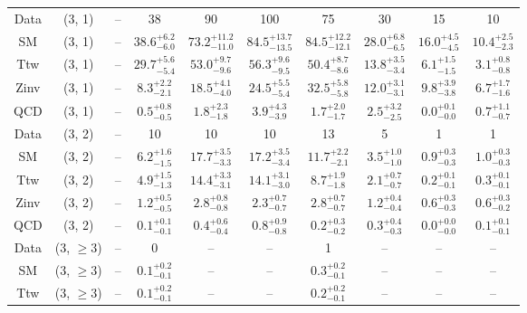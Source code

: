 \begin{table}[h!]
{\begin{tabular}{cccccccccc}
	Data & (3, 1) & -- & 38 & 90 & 100 & 75 & 30 & 15 & 10 \\[0.5ex] 
	SM & (3, 1) & -- & $38.6^{+ 6.2 }_{- 6.0 }$ & $73.2^{+ 11.2 }_{- 11.0 }$ & $84.5^{+ 13.7 }_{- 13.5 }$ & $84.5^{+ 12.2 }_{- 12.1 }$ & $28.0^{+ 6.8 }_{- 6.5 }$ & $16.0^{+ 4.5 }_{- 4.5 }$ & $10.4^{+ 2.5 }_{- 2.3 }$ \\[0.5ex] 
	Ttw & (3, 1) & -- & $29.7^{+ 5.6 }_{- 5.4 }$ & $53.0^{+ 9.7 }_{- 9.6 }$ & $56.3^{+ 9.6 }_{- 9.5 }$ & $50.4^{+ 8.7 }_{- 8.6 }$ & $13.8^{+ 3.5 }_{- 3.4 }$ & $6.1^{+ 1.5 }_{- 1.5 }$ & $3.1^{+ 0.8 }_{- 0.8 }$ \\[0.5ex] 
	Zinv & (3, 1) & -- & $8.3^{+ 2.2 }_{- 2.1 }$ & $18.5^{+ 4.1 }_{- 4.0 }$ & $24.5^{+ 5.5 }_{- 5.4 }$ & $32.5^{+ 5.8 }_{- 5.8 }$ & $12.0^{+ 3.1 }_{- 3.1 }$ & $9.8^{+ 3.9 }_{- 3.8 }$ & $6.7^{+ 1.7 }_{- 1.6 }$ \\[0.5ex] 
	QCD & (3, 1) & -- & $0.5^{+ 0.8 }_{- 0.5 }$ & $1.8^{+ 2.3 }_{- 1.8 }$ & $3.9^{+ 4.3 }_{- 3.9 }$ & $1.7^{+ 2.0 }_{- 1.7 }$ & $2.5^{+ 3.2 }_{- 2.5 }$ & $0.0^{+ 0.1 }_{- 0.0 }$ & $0.7^{+ 1.1 }_{- 0.7 }$ \\[0.5ex] 
	Data & (3, 2) & -- & 10 & 10 & 10 & 13 & 5 & 1 & 1 \\[0.5ex] 
	SM & (3, 2) & -- & $6.2^{+ 1.6 }_{- 1.5 }$ & $17.7^{+ 3.5 }_{- 3.3 }$ & $17.2^{+ 3.5 }_{- 3.4 }$ & $11.7^{+ 2.2 }_{- 2.1 }$ & $3.5^{+ 1.0 }_{- 1.0 }$ & $0.9^{+ 0.3 }_{- 0.3 }$ & $1.0^{+ 0.3 }_{- 0.3 }$ \\[0.5ex] 
	Ttw & (3, 2) & -- & $4.9^{+ 1.5 }_{- 1.3 }$ & $14.4^{+ 3.3 }_{- 3.1 }$ & $14.1^{+ 3.1 }_{- 3.0 }$ & $8.7^{+ 1.9 }_{- 1.8 }$ & $2.1^{+ 0.7 }_{- 0.7 }$ & $0.2^{+ 0.1 }_{- 0.1 }$ & $0.3^{+ 0.1 }_{- 0.1 }$ \\[0.5ex] 
	Zinv & (3, 2) & -- & $1.2^{+ 0.5 }_{- 0.5 }$ & $2.8^{+ 0.8 }_{- 0.8 }$ & $2.3^{+ 0.7 }_{- 0.7 }$ & $2.8^{+ 0.7 }_{- 0.7 }$ & $1.2^{+ 0.4 }_{- 0.4 }$ & $0.6^{+ 0.3 }_{- 0.3 }$ & $0.6^{+ 0.3 }_{- 0.2 }$ \\[0.5ex] 
	QCD & (3, 2) & -- & $0.1^{+ 0.1 }_{- 0.1 }$ & $0.4^{+ 0.6 }_{- 0.4 }$ & $0.8^{+ 0.9 }_{- 0.8 }$ & $0.2^{+ 0.3 }_{- 0.2 }$ & $0.3^{+ 0.4 }_{- 0.3 }$ & $0.0^{+ 0.0 }_{- 0.0 }$ & $0.1^{+ 0.1 }_{- 0.1 }$ \\[0.5ex] 
	Data & (3, $\ge3$) & -- & 0 & -- & -- & 1 & -- & -- & -- \\[0.5ex] 
	SM & (3, $\ge3$) & -- & $0.1^{+ 0.2 }_{- 0.1 }$ & -- & -- & $0.3^{+ 0.2 }_{- 0.1 }$ & -- & -- & -- \\[0.5ex] 
	Ttw & (3, $\ge3$) & -- & $0.1^{+ 0.2 }_{- 0.1 }$ & -- & -- & $0.2^{+ 0.2 }_{- 0.1 }$ & -- & -- & -- \\[0.5ex] 

\end{tabular}}
\end{table}
